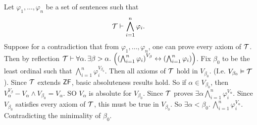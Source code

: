 \documentclass{article}
\begin{document}
\proof Let $\varphi_{1}, \dots, \varphi_{n}$ be a set of sentences such that \[ \mathcal{T} \vdash \bigwedge_{i=1}^{n} \varphi_{i}.\] Suppose for a contradiction that from $\varphi_{1}, \dots, \varphi_{n}$, one can prove every axiom of $\mathcal{T}$. Then by reflection $\mathcal{T} \vdash \forall \alpha. \, \exists \beta > \alpha. \, \left( \left(\bigwedge_{i=1}^{n} \varphi_{i}\right)^{V_{\beta}} \leftrightarrow \left(\bigwedge_{i=1}^{n} \varphi_{i} \right) \right)$.
Fix $\beta_{0}$ to be the least ordinal such that $\bigwedge_{i=1}^{n} \varphi_{i}^{V_{\beta_{0}}}$. Then all axioms of $\mathcal{T}$ hold in $V_{\beta_{0}}$. (I.e. $V_{\beta_{0}} \vDash \mathcal{T}$). Since $\mathcal{T}$ extends $\mathsf{ZF}$, basic absoluteness results hold. So if $\alpha \in V_{\beta_{0}}$, then $V_{\alpha}^{V_{\beta}} - V_{\alpha} \wedge V_{\beta_{0}} = V_{\alpha}$. SO $V_{\alpha}$ is absolute for $V_{\beta_{0}}$. Since $\mathcal{T}$ proves $\exists \alpha \bigwedge_{i=1}^{n} \varphi_{i}^{V_{\alpha}}$. Since $V_{\beta_{0}}$ satisfies every axiom of $\mathcal{T}$, this must be true in $V_{\beta_{0}}$. So $\exists \alpha < \beta_{0}. \, \bigwedge_{i=1}^{n} \varphi_{i}^{V_{\alpha}}$. Contradicting the minimality of $\beta_{0}$.\endproof
\newlec
\end{document}
